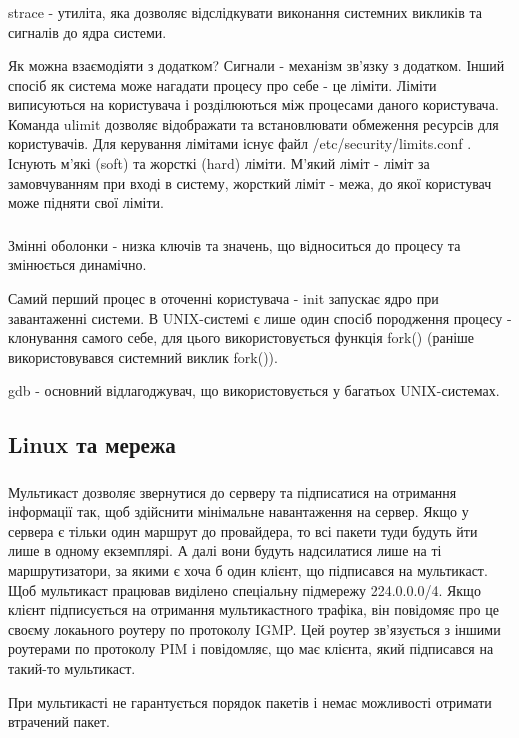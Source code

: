 \documentclass[t]{beamer}  %
\begin{document}
\begin{frame}
 	\frametitle{\insertsection} 
 	\framesubtitle{\insertsubsection}
strace - утиліта, яка дозволяє відслідкувати виконання системних викликів та сигналів до ядра системи.

Як можна взаємодіяти з додатком? Сигнали - механізм зв'язку з додатком. Інший спосіб як система може нагадати процесу про себе - це ліміти. Ліміти виписуються на користувача і розділюються між процесами даного користувача. Команда ulimit дозволяє відображати та встановлювати обмеження ресурсів для користувачів. Для керування лімітами існує файл /etc/security/limits.conf . Існують м'які (soft) та жорсткі (hard) ліміти. М'який ліміт - ліміт за замовчуванням при вході в систему, жорсткий ліміт - межа, до якої користувач може підняти свої ліміти. 
\end{frame}

\begin{frame}
 	\frametitle{\insertsection} 
 	\framesubtitle{\insertsubsection}
Змінні оболонки - низка ключів та значень, що відноситься до процесу та змінюється динамічно. 

Самий перший процес в оточенні користувача - init запускає ядро при завантаженні системи. В UNIX-системі є лише один спосіб породження процесу - клонування самого себе, для цього використовується функція fork()  (раніше використовувався системний виклик fork()).

gdb - основний відлагоджувач, що використовується у багатьох UNIX-системах.
\end{frame}

\subsection{Linux та мережа}

\begin{frame}
 	\frametitle{\insertsection} 
 	\framesubtitle{\insertsubsection}
Мультикаст дозволяє звернутися до серверу та підписатися на отримання інформації так, щоб здійснити мінімальне навантаження на сервер. Якщо у сервера є тільки один маршрут до провайдера, то всі пакети туди будуть йти лише в одному екземплярі. А далі вони будуть  надсилатися лише на ті маршрутизатори, за якими є хоча б один клієнт, що підписався на мультикаст. Щоб мультикаст працював виділено спеціальну підмережу 224.0.0.0/4. Якщо клієнт підписується на отримання мультикастного трафіка, він повідомяє про це своєму локаьного роутеру по протоколу IGMP. Цей роутер зв'язується з іншими роутерами по протоколу PIM і повідомляє, що має клієнта, який підписався на такий-то мультикаст.

При мультикасті не гарантується порядок пакетів і немає можливості отримати втрачений пакет.
\end{frame}
\end{document}
